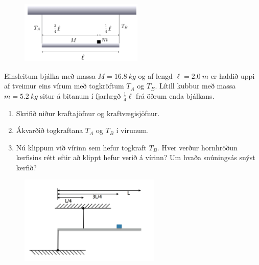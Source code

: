 \ifdefined \wholebook \else\documentclass[oneside]{book}\usepackage{EdlBook}\graphicspath{{figures/}}
\begin{document}
\begin{enumerate}[label = \textbf{Dæmi \thechapter.\arabic*.}]
\vspace{0.5cm}

\begin{minipage}{\linewidth}
\begin{figure}
\vspace{-0.25cm}
\includegraphics[width=2.3in]{images/bjalkens.png}
\end{figure}

\item Einsleitum bjálka með massa $M = \SI{16.8}{kg}$ og af lengd $\ell = \SI{2.0}{m}$ er haldið uppi af tveimur eins vírum með togkröftum $T_A$ og $T_B$. Lítill kubbur með massa $m = \SI{5.2}{kg}$ situr á bitanum í fjarlægð $\frac{1}{4}\ell$ frá öðrum enda bjálkans. 
\end{minipage}
\vspace{0.1cm}
\begin{enumerate}[label = \textbf{(\alph*)}]
    \item Skrifið niður kraftajöfnur og kraftvægisjöfnur.
    \item Ákvarðið togkraftana $T_A$ og $T_B$ í vírunum.
    \item Nú klippum við vírinn sem hefur togkraft $T_B$. Hver verður hornhröðun \\ kerfisins rétt eftir að klippt hefur verið á vírinn? Um hvaða snúningsás snýst kerfið?
\end{enumerate}

\vspace{0.5cm}

\begin{minipage}{\linewidth}

\begin{figure}
\vspace{-0.5cm}
\includegraphics[width=2.65in]{images/jafnvaegi.png}
\end{figure}


\end{minipage}
\end{enumerate}
\end{document}
